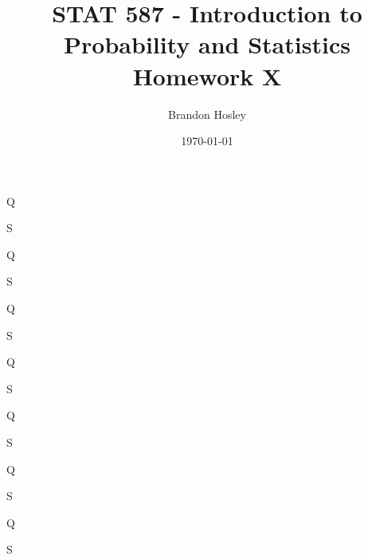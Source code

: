 \documentclass[answers]{exam}
\title{STAT 587 - Introduction to Probability and Statistics%
	\\ Homework X}
\author{Brandon Hosley}
\date{\today}
\begin{document}
\maketitle
\begin{questions}

\question 
Q
\begin{solution}
	S
\end{solution}

\question 
Q
\begin{solution}
	S
\end{solution}

\question 
Q
\begin{solution}
	S
\end{solution}

\question 
Q
\begin{solution}
	S
\end{solution}

\question 
Q
\begin{solution}
	S
\end{solution}

\question 
Q
\begin{solution}
	S
\end{solution}

\question 
Q
\begin{solution}
	S
\end{solution}


\end{questions}
\end{document}
